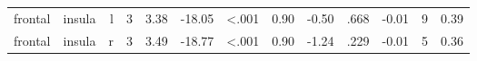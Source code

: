 \documentclass{article}
\begin{document}
\begin{longtable}{llrR{1.3cm}R{1cm}R{1.3cm}R{1cm}R{1cm}R{1.3cm}R{1cm}R{1.8cm}R{1.3cm}R{1.8cm}}
   frontal &                    insula &    l &         3 &                  3.38 &           -18.05 &      \textless.001 &                               0.90 &                         -0.50 &                            .668 &  -0.01 &      9 &      0.39 \\
   frontal &                    insula &    r &         3 &                  3.49 &           -18.77 &      \textless.001 &                               0.90 &                         -1.24 &                            .229 &  -0.01 &      5 &      0.36 \\
\end{longtable}
\end{document}
